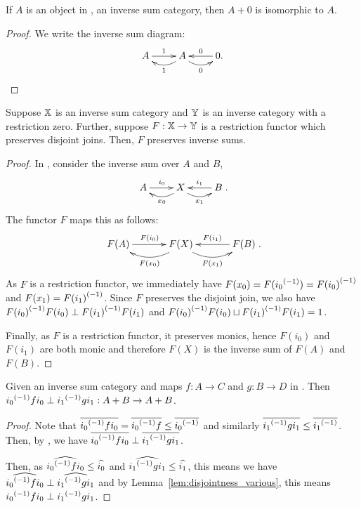 \begin{lemma}\label{lem:inverse_sums_have_identity_zero}
  If $A$ is an object in \X, an inverse sum category, then $A+0$ is isomorphic to $A$.
\end{lemma}
\begin{proof}
  We write the inverse sum diagram:
  \[
    \xymatrix{
      A\ar[r]^{1} &A\ar@/^9pt/[l]^{1} \ar@/_9pt/[r]_{0} & 0 \ar[l]_{0}.
    }
  \]
\end{proof}
\begin{lemma}\label{lem:functor_preserving_joins_preserves_inverse_sums}
  Suppose $\mathbb{X}$ is an inverse sum category and $\mathbb{Y}$ is an inverse category with a restriction zero.
  Further, suppose $F:\mathbb{X} \to \mathbb{Y}$ is a restriction functor which preserves disjoint joins. Then,
  $F$ preserves inverse sums.
\end{lemma}
\begin{proof}
  In \X, consider the inverse sum over $A$ and $B$,
  \[
    \xymatrix{
      A\ar[r]^{i_0} &X\ar@/^9pt/[l]^{x_0} \ar@/_9pt/[r]_{x_1} & B \ar[l]_{i_1}
    }.
  \]
  The functor $F$ maps this as follows:
  \[
    \xymatrix@R+10pt@C+10pt{
      F(A)\ar[r]^{F(i_0)} &F(X)\ar@/^13pt/[l]^{F(x_0)} \ar@/_13pt/[r]_{F(x_1)} & F(B)\ar[l]_{F(i_1)}
    }.
  \]
  As $F$ is a restriction functor, we immediately have $F(x_0) = F({i_0}^{(-1)}) = {F(i_0)}^{(-1)}$ and
  $F(x_1) = {F(i_1)}^{(-1)}$. Since $F$ preserves the disjoint join, we also have
  ${F(i_0)}^{(-1)}F(i_0) \perp{F(i_1)}^{(-1)}F(i_1)$ and
  ${F(i_0)}^{(-1)}F(i_0) \sqcup {F(i_1)}^{(-1)}F(i_1) = 1$.

  Finally, as $F$ is a restriction functor, it preserves monics, hence $F(i_0)$ and $F(i_1)$ are
  both monic and therefore $F(X)$ is the inverse sum of $F(A)$ and $F(B)$.

\end{proof}
\begin{lemma}\label{lem:inverse_sum_maps_are_perp}
  Given \X an inverse sum category and maps $f:A \to C$ and $g:B\to D$ in \X. Then
  ${i_0}^{(-1)} f i_0 \perp {i_1}^{(-1)} g i_1 : {{A}+{B}}\to {{A}+{B}}$.
\end{lemma}
\begin{proof}
  Note that $\overline{{i_0}^{(-1)} f i_0} = \overline{{i_0}^{(-1)} f} \le \overline{{i_0}^{(-1)}}$ and similarly
  $\overline{{i_1}^{(-1)} g i_1} \le \overline{{i_1}^{(-1)}}$. Then, by , we have
  $\overline{{i_0}^{(-1)} f i_0} \perp \overline{{i_1}^{(-1)} g i_1}$.

  Then, as $\widehat{{i_0}^{(-1)} f i_0} \le \widehat{i_0}$ and $\widehat{{i_1}^{(-1)} g i_1} \le \widehat{i_1}$, this
  means we have $\widehat{{i_0}^{(-1)} f i_0} \perp \widehat{{i_1}^{(-1)} g i_1}$ and by
  Lemma~\ref{lem:disjointness_various}, this means ${i_0}^{(-1)} f i_0\perp {i_1}^{(-1)} g i_1$.
\end{proof}



